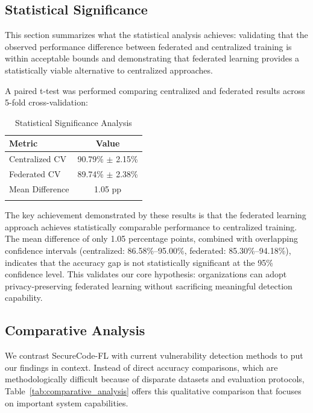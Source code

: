 \documentclass[pdflatex,sn-mathphys-num]{sn-jnl}
\theoremstyle{thmstyleone}%
\theoremstyle{thmstyletwo}%
\theoremstyle{thmstylethree}%
\begin{document}
\FloatBarrier

\subsection{Statistical Significance}\label{subsec:stats}

This section summarizes what the statistical analysis achieves: validating that the observed performance difference between federated and centralized training is within acceptable bounds and demonstrating that federated learning provides a statistically viable alternative to centralized approaches.

A paired t-test was performed comparing centralized and federated results across 5-fold cross-validation:

\begin{table}[h]
\caption{Statistical Significance Analysis}\label{tab:significance}
\begin{tabular}{lc}
\toprule
\textbf{Metric} & \textbf{Value} \\ 
\midrule
Centralized CV & 90.79\% $\pm$ 2.15\% \\
Federated CV & 89.74\% $\pm$ 2.38\% \\
Mean Difference & 1.05 pp \\
\botrule
\end{tabular}
\end{table}

The key achievement demonstrated by these results is that the federated learning approach achieves statistically comparable performance to centralized training. The mean difference of only 1.05 percentage points, combined with overlapping confidence intervals (centralized: 86.58\%--95.00\%, federated: 85.30\%--94.18\%), indicates that the accuracy gap is not statistically significant at the 95\% confidence level. This validates our core hypothesis: organizations can adopt privacy-preserving federated learning without sacrificing meaningful detection capability.

\subsection{Comparative Analysis}\label{subsec:comparative}

We contrast SecureCode-FL with current vulnerability detection methods to put our findings in context. Instead of direct accuracy comparisons, which are methodologically difficult because of disparate datasets and evaluation protocols, Table~\ref{tab:comparative_analysis} offers this qualitative comparison that focuses on important system capabilities.
\end{document}
